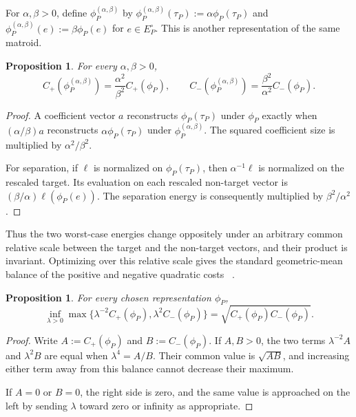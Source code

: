 \documentclass[11pt]{article}
\numberwithin{equation}{section}
\newtheorem{proposition}[definition]{Proposition}
\theoremstyle{remark}
\begin{document}
For $\alpha,\beta>0$, define $\phi_P^{(\alpha,\beta)}$ by
$\phi_P^{(\alpha,\beta)}(\tau_P):=\alpha\phi_P(\tau_P)$ and
$\phi_P^{(\alpha,\beta)}(e):=\beta\phi_P(e)$ for
$e\in E_P^\circ$. This is another representation of the same matroid.

\begin{proposition}
\label{prop:representation-scaling}
For every $\alpha,\beta>0$,
\begin{equation}
    C_+(\phi_P^{(\alpha,\beta)})
    =
    \frac{\alpha^2}{\beta^2}
    C_+(\phi_P),
    \qquad
    C_-(\phi_P^{(\alpha,\beta)})
    =
    \frac{\beta^2}{\alpha^2}
    C_-(\phi_P).
\end{equation}
\end{proposition}

\begin{proof}
A coefficient vector $a$ reconstructs $\phi_P(\tau_P)$ under $\phi_P$
exactly when $(\alpha/\beta)a$ reconstructs
$\alpha\phi_P(\tau_P)$ under $\phi_P^{(\alpha,\beta)}$. The squared
coefficient size is multiplied by $\alpha^2/\beta^2$.

For separation, if $\ell$ is normalized on $\phi_P(\tau_P)$, then
$\alpha^{-1}\ell$ is normalized on the rescaled target. Its evaluation on
each rescaled non-target vector is
$(\beta/\alpha)\ell(\phi_P(e))$. The separation energy is consequently
multiplied by $\beta^2/\alpha^2$.
\end{proof}

Thus the two worst-case energies change oppositely under an arbitrary common
relative scale between the target and the non-target vectors, and their
product is invariant. Optimizing over this relative scale gives the standard
geometric-mean balance of the positive and negative quadratic costs
~\cite{ReichardtSpalek2008,Reichardt2009}.

\begin{proposition}
\label{prop:representation-balance}
For every chosen representation $\phi_P$,
\begin{equation}
    \inf_{\lambda>0}
    \max
    \{
        \lambda^{-2}C_+(\phi_P),
        \lambda^2C_-(\phi_P)
    \}
    =
    \sqrt{
        C_+(\phi_P)C_-(\phi_P)
    }.
\end{equation}
\end{proposition}

\begin{proof}
Write $A:=C_+(\phi_P)$ and $B:=C_-(\phi_P)$. If $A,B>0$, the two terms
$\lambda^{-2}A$ and $\lambda^2B$ are equal when
$\lambda^4=A/B$. Their common value is $\sqrt{AB}$, and increasing either
term away from this balance cannot decrease their maximum.

If $A=0$ or $B=0$, the right side is zero, and the same value is approached
on the left by sending $\lambda$ toward zero or infinity as appropriate.
\end{proof}
\end{document}
